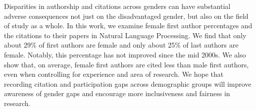 Disparities in authorship and citations across genders can have substantial adverse consequences not just on the disadvantaged gender, but also on the field of study as a whole. In this work, we examine female first author percentages and the citations to their papers in Natural Language Processing. We find that only about 29\% of first authors are female and only about 25\% of last authors are female. Notably, this percentage has not improved since the mid 2000s. We also show that, on average, female first authors are cited less than male first authors, even when controlling for experience and area of research. We hope that recording citation and participation gaps across demographic groups will improve awareness of gender gaps and encourage more inclusiveness and fairness in research.
